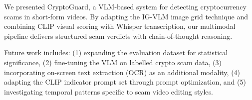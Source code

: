 \documentclass[12pt,a4paper]{article}
\begin{document}
We presented CryptoGuard, a VLM-based system for detecting cryptocurrency
scams in short-form videos. By adapting the IG-VLM image grid technique
and combining CLIP visual scoring with Whisper transcription, our
multimodal pipeline delivers structured scam verdicts with chain-of-thought
reasoning.

Future work includes: (1) expanding the evaluation dataset for
statistical significance, (2) fine-tuning the VLM on labelled crypto
scam data, (3) incorporating on-screen text extraction (OCR) as an
additional modality, (4) adapting the CLIP indicator prompt set through
prompt optimization, and (5) investigating temporal patterns specific
to scam video editing styles.



\end{document}

